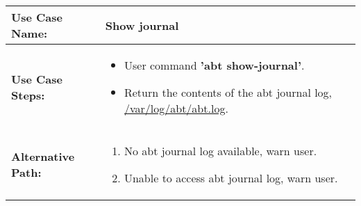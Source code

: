 \medskip

\begin{tabularx}{\linewidth}{|l|X|}
\hline
\textbf{Use Case Name:} & \textbf{Show journal} \\
\hline
\textbf{Use Case Steps:} & 
\begin{minipage}{\linewidth} 
  \vspace{0.05em}
  \begin{itemize}
    \item User command \textbf{'abt show-journal'}.
    \item Return the contents of the abt journal log, \url{/var/log/abt/abt.log}.
  \end{itemize}
  \vspace{0.05em}
\end{minipage}
\\
\hline 
\textbf{Alternative Path:} &
\begin{minipage}{\linewidth}
  \vspace{0.05em} 
  \begin{enumerate}
    \item No abt journal log available, warn user.
    \item Unable to access abt journal log, warn user.
  \end{enumerate}
  \vspace{0.05em} 
\end{minipage}
\\
\hline
\end{tabularx}